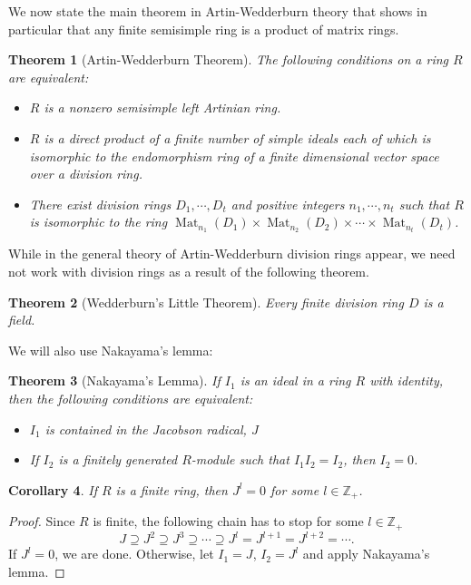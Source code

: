 \documentclass[11pt,reqno]{amsart}
\newtheorem{thm}{Theorem}[section]
\newtheorem{cor}[thm]{Corollary}
\begin{document}
We now state the main theorem in Artin-Wedderburn theory that shows in particular that any finite semisimple ring is a product of matrix rings.
\begin{thm}[Artin-Wedderburn Theorem] \label{AWT}
The following conditions on a ring $R$ are equivalent:
\vspace{-0.3cm}
\begin{itemize}
	\item $R$ is a nonzero semisimple left Artinian ring.
	\vspace{-0.3cm}
	\item $R$ is a direct product of a finite number of simple ideals each of which is isomorphic to the endomorphism ring of a finite dimensional vector space over a division ring.
	\vspace{-0.3cm}
	\item There exist division rings $D_1, \cdots, D_t$ and positive integers $n_1, \cdots, n_t$ such that $R$ is isomorphic to the ring $\operatorname{Mat}_{n_{1}}(D_1) \times \operatorname{Mat}_{n_{2}}(D_2) \times \cdots \times \operatorname{Mat}_{n_{t}}(D_t)$. 
\end{itemize}
\end{thm}
While in the general theory of Artin-Wedderburn division rings appear, we need not work with division rings as a result of the following theorem.
\begin{thm}[Wedderburn's Little Theorem] \label{WLT}
Every finite division ring $D$ is a field. 
\end{thm}
We will also use Nakayama's lemma: 
\begin{thm}[Nakayama's Lemma] \label{Nakayama}
If $I_{1}$ is an ideal in a ring $R$ with identity, then the following conditions are equivalent:
\vspace{-0.3cm}
\begin{itemize}
	\item $I_{1}$ is contained in the Jacobson radical, $J$
	\vspace{-0.3cm}
	\item If $I_{2}$ is a finitely generated $R$-module such that $I_{1}I_{2}=I_{2}$, then $I_{2}=0$.
\end{itemize}
\end{thm}

\begin{cor} \label{Nak2}
If $R$ is a finite ring, then $J^l=0$ for some $l \in \mathbb{Z}_{+}$. 
\end{cor}

\begin{proof}	
Since $R$ is finite, the following chain has to stop for some $l \in \mathbb{Z}_{+}$
\[J \supseteq J^2 \supseteq J^3 \supseteq \cdots \supseteq J^l =J^{l+1} = J^{l+2} = \cdots.\] 
If $J^l=0$, we are done. Otherwise, let $I_{1}=J$, $I_{2}= J^{l}$  and apply Nakayama's lemma. 
\end{proof}
\end{document}

